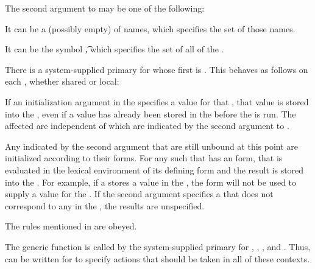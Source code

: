 The second argument to  may be one of the following:

\beginlist

\itemitem{\bull} It can be a (possibly empty)  of  names,
which specifies the set of those  names. 

% 

\itemitem{\bull} It can be the symbol \t, which specifies the set of all of the .

\endlist
                                               
There is a system-supplied primary  for 
whose first  is .
This  behaves as follows on each , 
whether shared or local:

\beginlist

\itemitem{\bull} If an initialization argument in the 
 specifies a value for that , 
that value is stored
into the , even if a value has already been stored in the 
before the  is run.  
The affected  are independent of which
 are indicated by the second argument to .

\itemitem{\bull} Any  
indicated by the second argument that are still
unbound at this point are initialized according to their 
 forms.  For any such  
that has an  form,
that  is evaluated in the 
lexical environment of its defining 
 form and the result is stored into the .  
For example,
if a  stores a value in the 
, the  form will not be used to supply a value 
for the .  If
the second argument specifies a  that does not correspond to any
  
in the , the results are unspecified.

\itemitem{\bull} The rules mentioned in {\secref\InitargRules} are obeyed.

\endlist
                      
The generic function  is called by the
system-supplied primary  
for ,
, 
, and 
.  Thus,  can be written for 
 to specify actions that should be taken in all of
these contexts.

